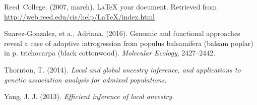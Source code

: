 \documentclass[12pt,twoside]{reedthesis}
\theoremstyle{definition}
\theoremstyle{definition}
\theoremstyle{remark}
\begin{document}
  \hypertarget{ref-reedweb2007}{}
  Reed~College. (2007, march). LaTeX your document. Retrieved from
  \url{http://web.reed.edu/cis/help/LaTeX/index.html}
  
  \hypertarget{ref-suarez2016}{}
  Suarez-Gonzalez, et a., Adriana. (2016). Genomic and functional
  approaches reveal a case of adaptive introgression from populus
  balsamifera (balsam poplar) in p. trichocarpa (black cottonwood).
  \emph{Molecular Ecology}, 2427--2442.
  
  \hypertarget{ref-thornton2014}{}
  Thornton, T. (2014). \emph{Local and global ancestry inference, and
  applications to genetic association analysis for admixed populations.}
  
  \hypertarget{ref-yang2013}{}
  Yang, J. J. (2013). \emph{Efficient inference of local ancestry.}


\end{document}
